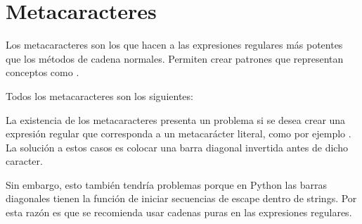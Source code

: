 \section{Metacaracteres}

Los metacaracteres son los que hacen a las expresiones regulares más potentes que los métodos de cadena normales. Permiten crear patrones que representan conceptos como .\smallskip

Todos los metacaracteres son los siguientes:


La existencia de los metacaracteres presenta un problema si se desea crear una expresión regular que corresponda a un metacarácter literal, como por ejemplo . La solución a estos casos es colocar una barra diagonal invertida \ttt{\textbackslash} antes de dicho caracter.\smallskip

Sin embargo, esto también tendría problemas porque en Python las barras diagonales \ttt{\textbackslash} tienen la función de iniciar secuencias de escape dentro de strings. Por esta razón es que se recomienda usar cadenas puras en las expresiones regulares.


\clearpage